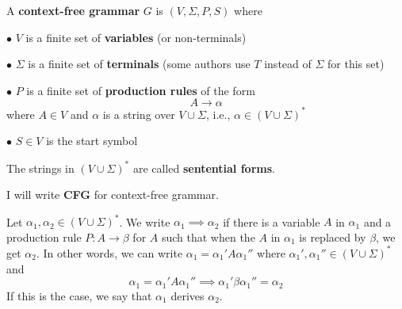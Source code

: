 \begin{defn}
A \textbf{context-free grammar} $G$ is $(V, \Sigma, P, S)$ where
\begin{mylist}
 \item[$\bullet$] $V$ is a finite set of \textbf{variables} (or non-terminals)
 \item[$\bullet$] $\Sigma$ is a finite set of \textbf{terminals}
 (some authors use $T$ instead of $\Sigma$ for this set)
 \item[$\bullet$] $P$ is a finite set of
 \textbf{production rules} of the form
  \[
  A \rightarrow \alpha
  \]
  where $A \in V$ and $\alpha$ is a string over $V \cup \Sigma$, i.e.,
  $\alpha \in (V\cup \Sigma)^*$
 \item[$\bullet$] $S \in V$ is the start symbol
\end{mylist}
The strings in $(V \cup \Sigma)^*$ are called
\textbf{sentential forms}.

I will write \textbf{CFG} for context-free grammar.

Let $\alpha_1, \alpha_2 \in (V \cup \Sigma)^*$.
We write $\alpha_1 \implies \alpha_2$ if there is a variable $A$ in $\alpha_1$
and a production rule $P: A \rightarrow \beta$ for $A$ such that 
when the $A$ in $\alpha_1$ is replaced by $\beta$, we get $\alpha_2$.
In other words, we can write $\alpha_1 = \alpha_1' A \alpha_1''$ where
$\alpha_1', \alpha_1'' \in (V \cup \Sigma)^*$ and 
\[
\alpha_1 
= \alpha_1' A \alpha_1'' \implies \alpha_1' \beta \alpha_1'' = \alpha_2
\]
If this is the case, we say that $\alpha_1$ derives $\alpha_2$.
\end{defn}


